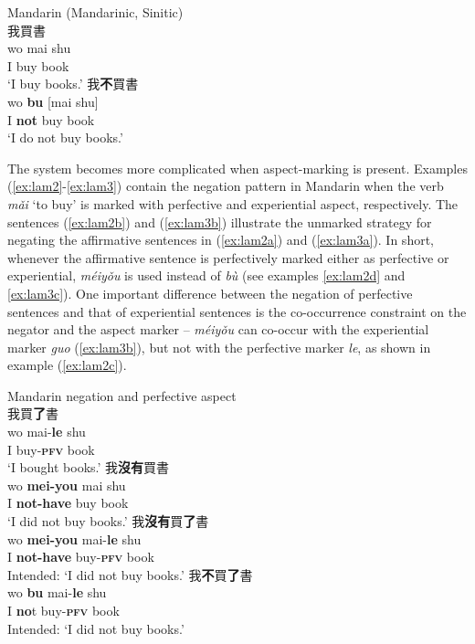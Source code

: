 \documentclass[output=paper]{langscibook}
\begin{document}

\ea Mandarin (Mandarinic, Sinitic) \label{ex:lam1}\\ 
  \ea 我買書 \label{ex:lam1a}\\
    \gll wo mai	shu \\
         I	buy	book\\
    \glt `I buy books.'
  \ex 我\textbf{不}買書 \label{ex:lam1b}\\
    \gll wo \textbf{bu} [mai shu]\\
    	I \textbf{not} buy book\\
    \glt `I do not buy books.'
\z \z

The system becomes more complicated when aspect-marking is present. Examples (\ref{ex:lam2}-\ref{ex:lam3}) contain the negation pattern in Mandarin when the verb \textit{mǎi} `to buy' is marked with perfective and experiential aspect, respectively. The sentences (\ref{ex:lam2b}) and (\ref{ex:lam3b}) illustrate the unmarked strategy for negating the affirmative sentences in (\ref{ex:lam2a}) and (\ref{ex:lam3a}). In short, whenever the affirmative sentence is perfectively marked either as perfective or experiential, \textit{méiyǒu} is used instead of \textit{bù} (see examples \ref{ex:lam2d} and \ref{ex:lam3c}). One important difference between the negation of perfective sentences and that of experiential sentences is the co-occurrence constraint on the negator and the aspect marker – \textit{méiyǒu} can co-occur with the experiential marker \textit{guo} (\ref{ex:lam3b}), but not with the perfective marker \textit{le}, as shown in example (\ref{ex:lam2c}). 

\ea Mandarin negation and perfective aspect \label{ex:lam2}\\
  \ea 我買\textbf{了}書 \label{ex:lam2a}\\
    \gll wo	mai-\textbf{le} shu \\
    I buy-\textbf{\textsc{pfv}} book\\
    \glt `I bought books.'
  \ex 我\textbf{沒有}買書 \label{ex:lam2b}\\
    \gll wo	\textbf{mei-you} mai shu \\
    I \textbf{not-have} buy book\\
    \glt `I did not buy books.'
  \ex 我\textbf{沒有}買\textbf{了}書 \label{ex:lam2c}\\
  	\gll *wo	 \textbf{mei-you} mai-\textbf{le} shu\\
  	I \textbf{not-have} buy-\textbf{\textsc{pfv}} book\\
  	\glt Intended: `I did not buy books.'
  \ex 我\textbf{不}買\textbf{了}書 \label{ex:lam2d}\\
  	\gll *wo	 \textbf{bu} mai-\textbf{le} shu \\
  	I \textbf{no}t buy-\textbf{\textsc{pfv}} book\\
  	\glt Intended: `I did not buy books.'
\z \z
\end{document}
